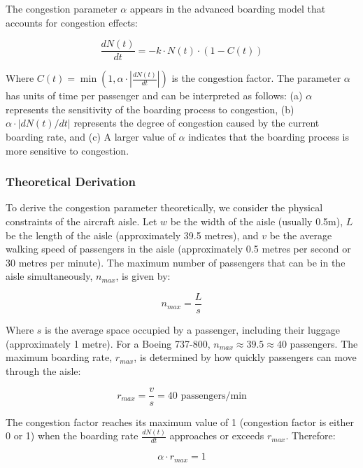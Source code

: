 \documentclass[12pt]{article}
\begin{document}
The congestion parameter $\alpha$ appears in the advanced boarding model that accounts for congestion effects:

\begin{equation}
\frac{dN(t)}{dt} = -k \cdot N(t) \cdot (1 - C(t))
\end{equation}

Where $C(t) = \min(1, \alpha \cdot |\frac{dN(t)}{dt}|)$ is the congestion factor. The parameter $\alpha$ has units of time per passenger and can be interpreted as follows: (a) $\alpha$ represents the sensitivity of the boarding process to congestion, (b) $\alpha \cdot |dN(t)/dt|$ represents the degree of congestion caused by the current boarding rate, and (c) A larger value of $\alpha$ indicates that the boarding process is more sensitive to congestion.

\subsubsection{Theoretical Derivation}

To derive the congestion parameter theoretically, we consider the physical constraints of the aircraft aisle. Let $w$ be the width of the aisle (usually 0.5m), $L$ be the length of the aisle (approximately 39.5 metres), and $v$ be the average walking speed of passengers in the aisle (approximately 0.5 metres per second or 30 metres per minute). The maximum number of passengers that can be in the aisle simultaneously, $n_{max}$, is given by:

\begin{equation}
n_{max} = \frac{L}{s}
\end{equation}

Where $s$ is the average space occupied by a passenger, including their luggage (approximately 1 metre). For a Boeing 737-800, $n_{max} \approx 39.5 \approx 40$ passengers. The maximum boarding rate, $r_{max}$, is determined by how quickly passengers can move through the aisle:

\begin{equation}
r_{max} = \frac{v}{s} = 40 \text{ passengers/min}
\end{equation}

The congestion factor reaches its maximum value of 1 (congestion factor is either 0 or 1) when the boarding rate $\frac{dN(t)}{dt}$ approaches or exceeds $r_{max}$. Therefore:

\begin{equation}
\alpha \cdot r_{max} = 1
\end{equation}
\end{document}
